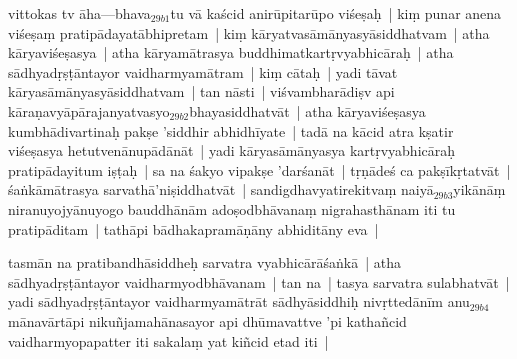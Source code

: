 \documentclass[article,12pt,a4paper]{memoir}%
\newcounter{parCount}
\begin{document}
	  \pstart \leavevmode%
	\label{thakur75-52.8}\label{sarit__ratnakīrtinibandhāvali__141640}vittokas tv āha—bhava{\tiny $_{29b1}$}tu vā kaścid anirūpitarūpo viśeṣaḥ | kiṃ punar anena viśeṣaṃ pratipādayatābhipretam | kiṃ kāryatvasāmānyasyāsiddhatvam | atha kāryaviśeṣasya | atha kāryamātrasya buddhimatkartṛvyabhicāraḥ | atha sādhyadṛṣṭāntayor vaidharmyamātram | kiṃ cātaḥ | yadi tāvat kāryasāmānyasyāsiddhatvam | tan nāsti | viśvambharādiṣv api kāraṇavyāpārajanyatvasyo{\tiny $_{29b2}$}bhayasiddhatvāt | atha kāryaviśeṣasya kumbhādivartinaḥ pakṣe 'siddhir abhidhīyate | tadā na kācid atra kṣatir viśeṣasya hetutvenānupādānāt | yadi kāryasāmānyasya kartṛvyabhicāraḥ pratipādayitum iṣṭaḥ | sa na śakyo vipakṣe 'darśanāt | tṛṇādeś ca pakṣīkṛtatvāt | śaṅkāmātrasya \label{ratnakīrtinibandhāvali__36r1PF7IMUZ7KUXZS9SZJ6Y0O7I}sarvathā'ni\label{ratnakīrtinibandhāvali__36r1PF7IMUYASOPXV8CSA661H3U}ṣiddhatvāt | sandigdhavyatirekitvaṃ naiyā{\tiny $_{29b3}$}yikānāṃ niranuyojyānuyogo bauddhānām adoṣodbhāvanaṃ nigrahasthānam iti tu pratipāditam | tathāpi bādhakapramāṇāny abhiditāny eva |
	{}
	\pend%
      

	  \pstart \leavevmode%
	tasmān na pratibandhāsiddheḥ sarvatra vyabhicārāśaṅkā | atha sādhyadṛṣṭāntayor vaidharmyodbhāvanam | tan na | tasya sarvatra sulabhatvāt | yadi sādhyadṛṣṭāntayor vaidharmyamātrāt sādhyāsiddhiḥ nivṛttedānīm anu{\tiny $_{29b4}$}mānavārtāpi nikuñjamahānasayor api dhūmavattve 'pi kathañcid vaidharmyopapatter iti sakalaṃ yat kiñcid etad\label{sarit__ratnakīrtinibandhāvali__143038} iti |
	{}
	\pend%
      
\end{document}
